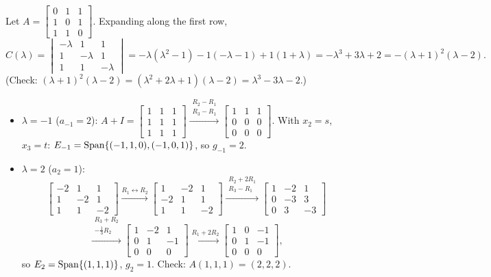 \begin{example}
Let $A=\begin{bmatrix}0&1&1\\1&0&1\\1&1&0\end{bmatrix}$. Expanding along the first row,
\[
C(\lambda)=\begin{vmatrix}-\lambda&1&1\\1&-\lambda&1\\1&1&-\lambda\end{vmatrix}
=-\lambda(\lambda^2-1)-1(-\lambda-1)+1(1+\lambda)
=-\lambda^3+3\lambda+2=-(\lambda+1)^2(\lambda-2).
\]
(Check: $(\lambda+1)^2(\lambda-2)=(\lambda^2+2\lambda+1)(\lambda-2)=\lambda^3-3\lambda-2$.)
\begin{itemize}
  \item $\lambda=-1$ ($a_{-1}=2$):
  $A+I=\begin{bmatrix}1&1&1\\1&1&1\\1&1&1\end{bmatrix}\xrightarrow{\substack{R_2-R_1\\R_3-R_1}}\begin{bmatrix}1&1&1\\0&0&0\\0&0&0\end{bmatrix}$.
  With $x_2=s$, $x_3=t$: $E_{-1}=\operatorname{Span}\{(-1,1,0),(-1,0,1)\}$, so $g_{-1}=2$.
  \item $\lambda=2$ ($a_2=1$):
  \[
  \begin{bmatrix}-2&1&1\\1&-2&1\\1&1&-2\end{bmatrix}
  \xrightarrow{R_1\leftrightarrow R_2}
  \begin{bmatrix}1&-2&1\\-2&1&1\\1&1&-2\end{bmatrix}
  \xrightarrow{\substack{R_2+2R_1\\R_3-R_1}}
  \begin{bmatrix}1&-2&1\\0&-3&3\\0&3&-3\end{bmatrix}
  \]
  \[
  \xrightarrow{\substack{R_3+R_2\\-\frac13R_2}}
  \begin{bmatrix}1&-2&1\\0&1&-1\\0&0&0\end{bmatrix}
  \xrightarrow{R_1+2R_2}
  \begin{bmatrix}1&0&-1\\0&1&-1\\0&0&0\end{bmatrix},
  \]
  so $E_2=\operatorname{Span}\{(1,1,1)\}$, $g_2=1$. Check: $A(1,1,1)=(2,2,2)$.
\end{itemize}
\end{example}

